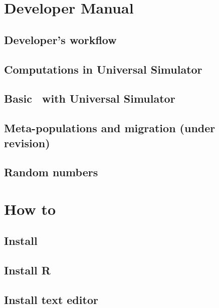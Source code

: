 \documentclass [a4paper, 11pt, openany]  {memoir}
\begin{document}

\part{Developer Manual}

\chapter{Developer's workflow}

\chapter{Computations in Universal Simulator}

\chapter{Basic \protect\CPP\ with Universal Simulator}

\chapter{Meta-populations and migration (under revision)}

\chapter{Random numbers}

\part{How to}

\chapter{Install \protect\US}

\chapter{Install R}

\chapter{Install text editor}
\end{document}

